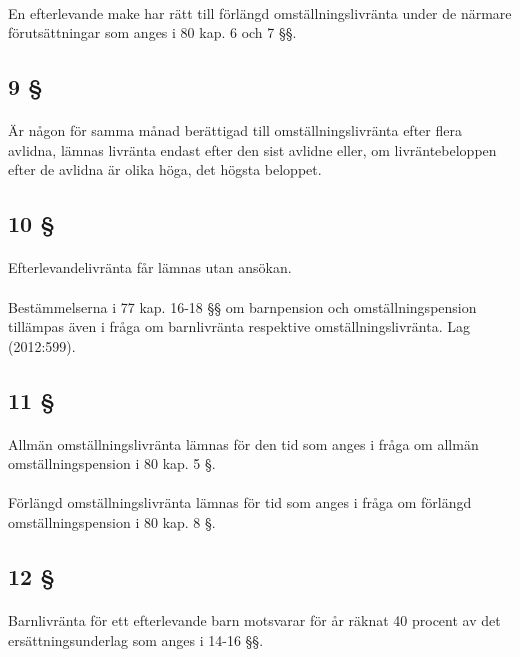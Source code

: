 \documentclass[a4paper,notitlepage,openany,10pt]{book}
\begin{document}
\paragraph*{}
En efterlevande make har rätt till förlängd omställningslivränta under de närmare förutsättningar som anges i 80 kap. 6 och 7 §§.
\subsection*{9 §}
\paragraph*{}
Är någon för samma månad berättigad till omställningslivränta efter flera avlidna, lämnas livränta endast efter den sist avlidne eller, om livräntebeloppen efter de avlidna är olika höga, det högsta beloppet.
\subsection*{10 §}
\paragraph*{}
Efterlevandelivränta får lämnas utan ansökan.
\paragraph*{}
Bestämmelserna i 77 kap. 16-18 §§ om barnpension och omställningspension tillämpas även i fråga om barnlivränta respektive omställningslivränta.
Lag (2012:599).
\subsection*{11 §}
\paragraph*{}
Allmän omställningslivränta lämnas för den tid som anges i fråga om allmän omställningspension i 80 kap. 5 §.
\paragraph*{}
Förlängd omställningslivränta lämnas för tid som anges i fråga om förlängd omställningspension i 80 kap. 8 §.
\subsection*{12 §}
\paragraph*{}
Barnlivränta för ett efterlevande barn motsvarar för år räknat 40 procent av det ersättningsunderlag som anges i 14-16 §§.
\end{document}
